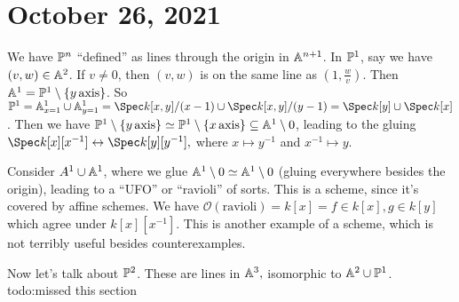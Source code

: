 \section{October 26, 2021} 
We have $\P^n $ ``defined'' as lines through the origin in $\A ^{n+1}$. In $\P^1$, say we have $(v,w) \in \A^2$. If $v\neq 0$, then $(v,w)$ is on the same line as  $(1, \frac{w}{v})$. Then $\A^1 = \P^1 \setminus  \{y \, \text{axis} \} $. So $\P^1=\A^1 _{x=1} \cup \A^1_{y=1}=\Spec k[x,y] / (x-1) \cup \Spec k[x,y] / (y-1)= \Spec k[y] \cup \Spec k[x]$. Then we have $\P^1 \setminus  \{ y \, \text{axis} \} \simeq  \P^1 \setminus \{x \, \text{axis} \} \subseteq \A^1 \setminus 0$, leading to the gluing $\Spec k[x][x ^{-1}] \leftrightarrow \Spec k[y][y ^{-1}],$ where $x \mapsto  y ^{-1} $ and $x ^{-1} \mapsto y$. 

Consider $A^1 \cup \A^1$, where we glue $\A^1 \setminus 0 \simeq \A^1 \setminus 0$ (gluing everywhere besides the origin), leading to a ``UFO'' or ``ravioli'' of sorts. This is a scheme, since it's covered by affine schemes. We have $\mathcal{O} ( \text{ravioli} )= k[x]=f \in k[x], g \in k[y]$ which agree under $k[x] [x ^{-1}]$. This is another example of a scheme, which is not terribly useful besides counterexamples.

Now let's talk about $\P^2$. These are lines in $\A^3,$ isomorphic to $\A^2 \cup  \P^1$. {\color{red}todo:missed this section} 

